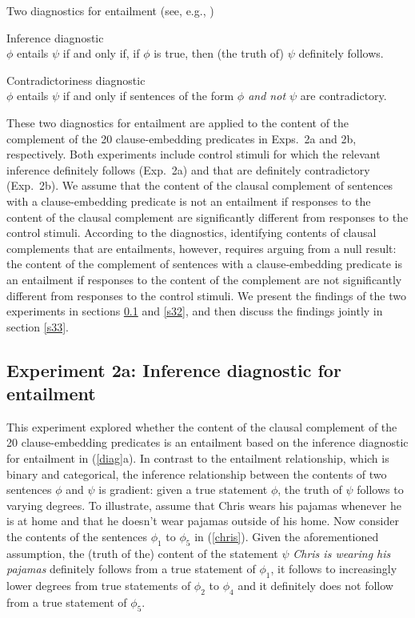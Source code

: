 \documentclass[11pt,fleqn]{article}
\newcommand{\6}{\mbox{$[\hspace*{-.6mm}[$}}
\newcommand{\9}{\mbox{$]\hspace*{-.6mm}]$}}
\begin{document}
\begin{exe}
\ex\label{diag} Two diagnostics for entailment \hfill (see, e.g., \citealt[\S3.1]{ccmg90})
\begin{xlist}
\ex  Inference diagnostic \\ $\phi$ entails $\psi$ if and only if, if $\phi$ is true, then (the truth of) $\psi$ definitely follows. 

\ex  Contradictoriness diagnostic \\ $\phi$ entails $\psi$ if and only if sentences of the form {\em $\phi$ and not $\psi$} are contradictory. 

\end{xlist}
\end{exe}
These two diagnostics for entailment are applied to the content of the complement of the 20 clause-embedding predicates in Exps.~2a and 2b, respectively. Both experiments include control stimuli for which the relevant inference definitely follows (Exp.~2a) and that are definitely contradictory (Exp.~2b). We assume that the content of the clausal complement of sentences with a clause-embedding predicate is not an entailment if responses to the content of the clausal complement are significantly different from responses to the control stimuli. According to the diagnostics, identifying contents of clausal complements that are entailments, however, requires arguing from a null result: the content of the complement of sentences with a clause-embedding predicate is an entailment if responses to the content of the complement are not significantly different from responses to the control stimuli. We present the findings of the two experiments in sections \ref{s31} and \ref{s32}, and then discuss the findings jointly in section \ref{s33}.

\subsection{Experiment 2a: Inference diagnostic for entailment}\label{s31}

This experiment explored whether the content of the clausal complement of the 20 clause-embedding predicates is an entailment based on the inference diagnostic for entailment in (\ref{diag}a). In contrast to the entailment relationship, which is binary and categorical, the inference relationship between the contents of two sentences $\phi$ and $\psi$ is gradient: given a true statement $\phi$, the truth of $\psi$ follows to varying degrees. To illustrate, assume that Chris wears his pajamas whenever he is at home and that he doesn't wear pajamas outside of his home. Now consider the contents of the sentences $\phi_1$ to $\phi_5$ in (\ref{chris}). Given the aforementioned assumption, the (truth of the) content of the statement $\psi$ {\em Chris is wearing his pajamas} definitely follows from a true statement of $\phi_1$, it follows to increasingly lower degrees from true statements of $\phi_2$ to $\phi_4$ and it definitely does not follow from a true statement of $\phi_5$. 
\end{document}
